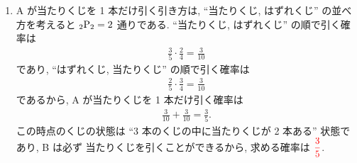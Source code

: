 \begin{qenumerate}
{\begin{enumerate}
{\begin{align}
					\frac{2}{3}\cdot\frac{1}{2} = \frac{1}{3}
				\end{align}
				である.
				したがって, 求める確率は
				\begin{align}
					\frac{3}{10}\cdot\left(\frac{1}{3} + \frac{1}{3}\right) = \red{\frac{1}{5}}.
				\end{align}
			}
			\item{
				A が当たりくじを 1 本だけ引く引き方は, ``当たりくじ, はずれくじ'' の並べ方を考えると ${{}_{2}\mathrm{P}_{2}} = 2$ 通りである.
				``当たりくじ, はずれくじ'' の順で引く確率は
				\begin{align}
					\frac{3}{5}\cdot\frac{2}{4} = \frac{3}{10}
				\end{align}
				であり, ``はずれくじ, 当たりくじ'' の順で引く確率は
				\begin{align}
					\frac{2}{5}\cdot\frac{3}{4} = \frac{3}{10}
				\end{align}
				であるから, A が当たりくじを 1 本だけ引く確率は
				\begin{align}
					\frac{3}{10} + \frac{3}{10} = \frac{3}{5}.
				\end{align}
				この時点のくじの状態は ``3 本のくじの中に当たりくじが 2 本ある'' 状態であり, B は必ず 当たりくじを引くことができるから, 求める確率は $\textcolor{red}{\dfrac{3}{5}}$.

}
\end{enumerate}}
\end{qenumerate}

